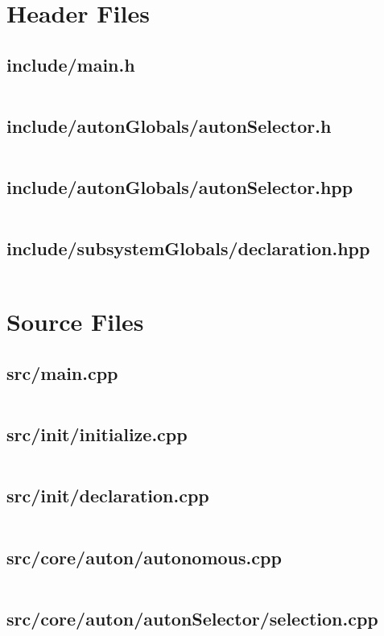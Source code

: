 \section{Header Files}

\subsection{include/main.h}
\inputminted[linenos,tabsize=2,breaklines, breakanywhere]{c}{main.h}
\pagebreak

\subsection{include/autonGlobals/autonSelector.h}
\inputminted[linenos,tabsize=2,breaklines, breakanywhere]{c}{autonSelector.h}
\pagebreak

\subsection{include/autonGlobals/autonSelector.hpp}
\inputminted[linenos,tabsize=2,breaklines, breakanywhere]{c}{autonSelector.hpp}
\pagebreak

\subsection{include/subsystemGlobals/declaration.hpp}
\inputminted[linenos,tabsize=2,breaklines, breakanywhere]{c}{declaration.hpp}
\pagebreak

\section{Source Files}

\subsection{src/main.cpp}
\inputminted[linenos,tabsize=2,breaklines, breakanywhere]{c}{main.cpp}
\pagebreak

\subsection{src/init/initialize.cpp}
\inputminted[linenos,tabsize=2,breaklines, breakanywhere]{c}{initialize.cpp}
\pagebreak

\subsection{src/init/declaration.cpp}
\inputminted[linenos,tabsize=2,breaklines, breakanywhere]{c}{declaration.cpp}
\pagebreak

\subsection{src/core/auton/autonomous.cpp}
\inputminted[linenos,tabsize=2,breaklines, breakanywhere]{c}{autonomous.cpp}
\pagebreak

\subsection{src/core/auton/autonSelector/selection.cpp}
\inputminted[linenos,tabsize=2,breaklines, breakanywhere]{c}{selection.cpp}
\pagebreak

